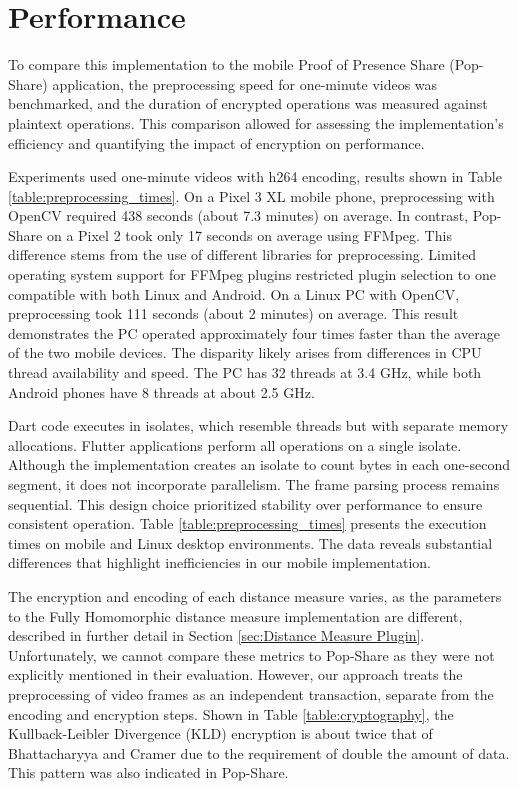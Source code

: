 \section{Performance}
\label{sec:Performance}
To compare this implementation to the mobile Proof of Presence Share (Pop-Share) application, the preprocessing speed for one-minute videos was benchmarked, and the duration of encrypted operations was measured against plaintext operations. This comparison allowed for assessing the implementation's efficiency and quantifying the impact of encryption on performance.



Experiments used one-minute videos with h264 encoding, results shown in Table \ref{table:preprocessing_times}. On a Pixel 3 XL mobile phone, preprocessing with OpenCV required 438 seconds (about 7.3 minutes) on average. In contrast, Pop-Share on a Pixel 2 took only 17 seconds on average using FFMpeg. This difference stems from the use of different libraries for preprocessing. Limited operating system support for FFMpeg plugins restricted plugin selection to one compatible with both Linux and Android. On a Linux PC with OpenCV, preprocessing took 111 seconds (about 2 minutes) on average. This result demonstrates the PC operated approximately four times faster than the average of the two mobile devices. The disparity likely arises from differences in CPU thread availability and speed. The PC has 32 threads at 3.4 GHz, while both Android phones have 8 threads at about 2.5 GHz.

Dart code executes in isolates, which resemble threads but with separate memory allocations. Flutter applications perform all operations on a single isolate. Although the implementation creates an isolate to count bytes in each one-second segment, it does not incorporate parallelism. The frame parsing process remains sequential. This design choice prioritized stability over performance to ensure consistent operation. Table \ref{table:preprocessing_times} presents the execution times on mobile and Linux desktop environments. The data reveals substantial differences that highlight inefficiencies in our mobile implementation.

The encryption and encoding of each distance measure varies, as the parameters to the Fully Homomorphic distance measure implementation are different, described in further detail in Section \ref{sec:Distance Measure Plugin}. Unfortunately, we cannot compare these metrics to Pop-Share as they were not explicitly mentioned in their evaluation. However, our approach treats the preprocessing of video frames as an independent transaction, separate from the encoding and encryption steps. Shown in Table \ref{table:cryptography}, the Kullback-Leibler Divergence (KLD) encryption is about twice that of Bhattacharyya and Cramer due to the requirement of double the amount of data. This pattern was also indicated in Pop-Share.

